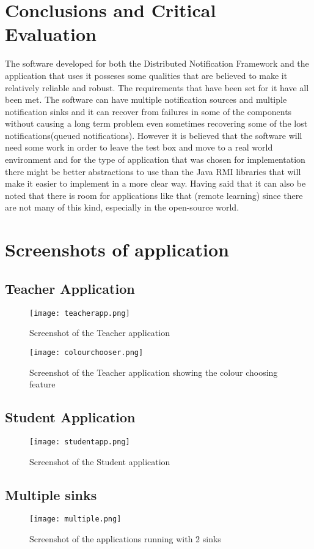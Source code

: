 \documentclass[a4paper,12pt,titlepage]{article}
\begin{document}
\section{Conclusions and Critical Evaluation}
The software developed for both the Distributed Notification Framework and the application that uses it posseses some qualities that are believed to make it relatively reliable and robust. The requirements that have been set for it have all been met. The software can have multiple notification sources and multiple notification sinks and it can recover from failures in some of the components without causing a long term problem even sometimes recovering some of the lost notifications(queued notifications). However it is believed that the software will need some work in order to leave the test box and move to a real world environment and for the type of application that was chosen for implementation there might be better abstractions to use than the Java RMI libraries that will make it easier to implement in a more clear way. Having said that it can also be noted that there is room for applications like that (remote learning) since there are not many of this kind, especially in the open-source world.
\appendix
\section{Screenshots of application}
\subsection{Teacher Application}
\begin{figure}[h!]
  \centering
 \texttt{[image: teacherapp.png]}
\caption{Screenshot of the Teacher application}
\end{figure}
\begin{figure}[h!]
  \centering
 \texttt{[image: colourchooser.png]}
\caption{Screenshot of the Teacher application showing the colour choosing feature}
\end{figure}
\subsection{Student Application}
\begin{figure}[h!]
  \centering
 \texttt{[image: studentapp.png]}
\caption{Screenshot of the Student application}
\end{figure}
\subsection{Multiple sinks}
\begin{figure}[h!]
  \centering
 \texttt{[image: multiple.png]}
\caption{Screenshot of the applications running with 2 sinks}
\end{figure}
\end{document}
